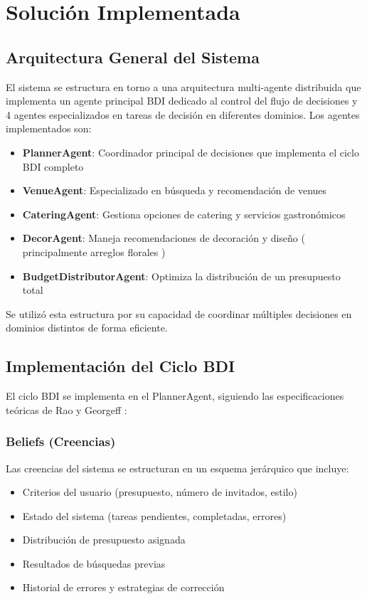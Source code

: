 \documentclass[runningheads,a4paper]{llncs}
\begin{document}
\section{Solución Implementada}

\subsection{Arquitectura General del Sistema}

El sistema se estructura en torno a una arquitectura multi-agente distribuida que implementa un agente principal BDI dedicado al control del flujo de decisiones y 4 agentes especializados en tareas de decisión en diferentes dominios. Los agentes implementados son:

\begin{itemize}
    \item \textbf{PlannerAgent}: Coordinador principal de decisiones que implementa el ciclo BDI completo
    \item \textbf{VenueAgent}: Especializado en búsqueda y recomendación de venues
    \item \textbf{CateringAgent}: Gestiona opciones de catering y servicios gastronómicos
    \item \textbf{DecorAgent}: Maneja recomendaciones de decoración y diseño ( principalmente arreglos florales )
    \item \textbf{BudgetDistributorAgent}: Optimiza la distribución de un presupuesto total
\end{itemize}

Se utilizó esta estructura por su capacidad de coordinar múltiples decisiones en dominios distintos de forma eficiente.

\subsection{Implementación del Ciclo BDI}

El ciclo BDI se implementa en el PlannerAgent, siguiendo las especificaciones teóricas de Rao y Georgeff \cite{rao1995bdi}:

\subsubsection{Beliefs (Creencias)}
Las creencias del sistema se estructuran en un esquema jerárquico que incluye:
\begin{itemize}
    \item Criterios del usuario (presupuesto, número de invitados, estilo)
    \item Estado del sistema (tareas pendientes, completadas, errores)
    \item Distribución de presupuesto asignada
    \item Resultados de búsquedas previas
    \item Historial de errores y estrategias de corrección
\end{itemize}
\end{document}
